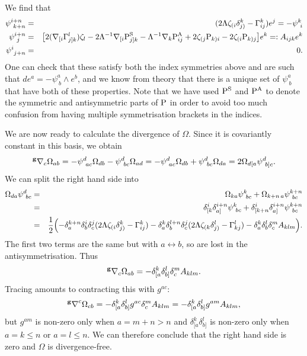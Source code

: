 We find that 
\begin{eqnarray*}
\psi_{\ k+n}^{i+n} & = & (2\Lambda \zeta_{(i}\delta_{j)}^{k}-\Gamma_{ij}^{k})e^{j}=-\psi_{\ i}^{k}\\
\psi_{\ j}^{i+n} & = & \bigl[2({\nabla}_{[i}\Gamma_{j]k}^{l})\zeta_{l}-2\Lambda^{-1}{\nabla}_{[i}\mathrm{P}_{j]k}^{\mathrm{S}}-\Lambda^{-1}{\nabla}_{k}\mathrm{P}_{ij}^{\mathrm{A}}+2\zeta_{(j}\mathrm{P}_{k)i}-2\zeta_{(i}\mathrm{P}_{k)j}\bigr]e^{k}=:A_{ijk}e^{k}\\
\psi_{\ j+n}^{i} & = & 0.
\end{eqnarray*}
One can check that these satisfy both the index symmetries above and
are such that $ de^{a}=-\psi_{\ b}^{a}\wedge e^{b}$, and
we know from theory that there is a unique set of $\psi_{\ b}^{a}$
that have both of these properties. Note that we have used $\mathrm{P}^{\mathrm{S}}$
and $\mathrm{P}^{\mathrm{A}}$ to denote the symmetric and antisymmetric parts
of $\mathrm{P}$ in order to avoid too much confusion from having multiple
symmetrisation brackets in the indices.

We are now ready to calculate the divergence of $\Omega$. Since it
is covariantly constant in this basis, we obtain
\[
{^{\bf g}\nabla}_{c}\Omega_{ab}=-\psi_{\ ac}^{d}\Omega_{db}-\psi_{\ bc}^{d}\Omega_{ad}=-\psi_{\ ac}^{d}\Omega_{db}+\psi_{\ bc}^{d}\Omega_{da}=2\Omega_{d[a}\psi_{\ b]c}^{d}.
\]
We can split the right hand side into
\begin{eqnarray*}
\Omega_{da}\psi_{\ bc}^{d} & = & \Omega_{ka}\psi_{\ bc}^{k}+\Omega_{k+n\, a}\psi_{\ bc}^{k+n}\\
 & = & \delta_{[k}^{i}\delta_{a]}^{i+n}\psi_{\ bc}^{k}+\delta_{[k+n}^{i}\delta_{a]}^{i+n}\psi_{\ bc}^{k+n}\\
 & = & \frac{1}{2}\Bigl(-\delta_{a}^{k+n}\delta_{b}^{i}\delta_{c}^{j}(2\Lambda \zeta_{(i}\delta_{j)}^{k}-\Gamma_{ij}^{k})-\delta_{a}^{k}\delta_{b}^{l+n}\delta_{c}^{j}(2\Lambda \zeta_{(k}\delta_{j)}^{l}-\Gamma_{kj}^{l})-\delta_{a}^{k}\delta_{b}^{l}\delta_{c}^{m}A_{klm}\Bigr).\\
\end{eqnarray*}
The first two terms are the same but with $a\leftrightarrow b$, so
are lost in the antisymmetrisation. Thus
\[
{^{\bf g}\nabla}_{c}\Omega_{ab}=-\delta_{[a}^{k}\delta_{b]}^{l}\delta_{c}^{m}A_{klm}.
\]
Tracing amounts to contracting this with $g^{ac}$:
\[
{^{\bf g}\nabla}^{c}\Omega_{cb}=-\delta_{[a}^{k}\delta_{b]}^{l}g^{ac}\delta_{c}^{m}A_{klm}=-\delta_{[a}^{k}\delta_{b]}^{l}g^{am}A_{klm},
\]
but $g^{am}$ is non-zero only when $a=m+n>n$ and $\delta_{[a}^{k}\delta_{b]}^{l}$
is non-zero only when $a=k\leq n$ or $a=l\leq n$. We can therefore
conclude that the right hand side is zero and $\Omega$ is divergence-free.
\koniec

